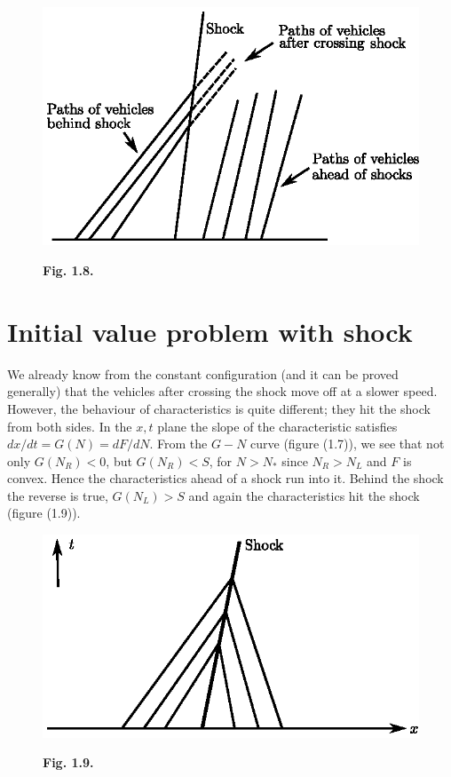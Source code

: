 \begin{figure}[H]
\centering
\includegraphics{figures/fig1.8.eps}
\centerline{\bf Fig. 1.8.}
\end{figure}

\section{Initial value problem with shock}\label{chap1:sec1.4}
We already know from the constant configuration (and it can be proved generally) that the vehicles after crossing the shock move off at a slower speed. However, the behaviour of characteristics is quite different; they hit the shock from both sides. In the $x,t$ plane the slope of the characteristic satisfies $dx/dt = G(N) = dF/dN$. From the $G-N$ curve (figure (1.7)), we see that not only $G(N_R) < 0$, but $G(N_R)< S$, for $N > N_*$ since $N_R > N_L$ and $F$ is convex. Hence the characteristics ahead of a shock run into it. Behind the shock the reverse is true, $G(N_L) > S$ and again the characteristics hit the shock (figure (1.9)).

\begin{figure}[H]
\centering
\includegraphics{figures/fig1.9.eps}
\centerline{\bf Fig. 1.9.}
\end{figure}\pageoriginale

